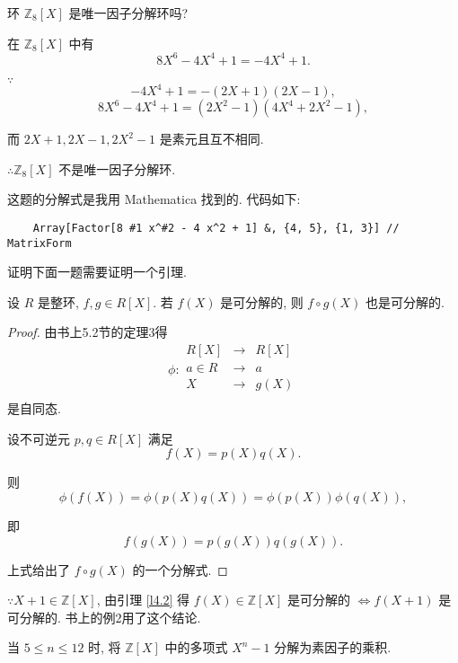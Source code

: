 \documentclass[UTF8]{ctexart}
\begin{document}
\begin{exercise}%
    环 $\mathbb{Z}_8[X]$ 是唯一因子分解环吗?
\end{exercise}
\begin{solution}
    在 $\mathbb{Z}_8[X]$ 中有
    \[8X^6-4X^4+1=-4X^4+1.\]

    $\because$
    \[-4X^4+1=-(2X+1)(2X-1),\]
    \[8X^6-4X^4+1=(2X^2-1)(4X^4+2X^2-1),\]

    而 $2X+1,2X-1,2X^2-1$ 是素元且互不相同.

    $\therefore\mathbb{Z}_8[X]$ 不是唯一因子分解环.
\end{solution}
\begin{note}
    这题的分解式是我用 Mathematica 找到的. 代码如下:
    \begin{verbatim}
    Array[Factor[8 #1 x^#2 - 4 x^2 + 1] &, {4, 5}, {1, 3}] // MatrixForm
    \end{verbatim}
\end{note}
证明下面一题需要证明一个引理.
\begin{lemma}\label{l4.2}
    设 $R$ 是整环, $f,g\in R[X]$. 若 $f(X)$ 是可分解的, 则 $f\circ g(X)$ 也是可分解的.
\end{lemma}
\begin{proof}
    由书上5.2节的定理3得
    \[\phi:\begin{array}{rcl}
        R[X] & \to & R[X] \\
        a\in R & \to & a \\
        X & \to & g(X) \\
    \end{array}\]
    是自同态.

    设不可逆元 $p,q\in R[X]$ 满足
    \[f(X)=p(X)q(X).\]

    则
    \[\phi(f(X))=\phi(p(X)q(X))=\phi(p(X))\phi(q(X)),\]

    即
    \[f(g(X))=p(g(X))q(g(X)).\]

    上式给出了 $f\circ g(X)$ 的一个分解式.
\end{proof}
\begin{note}
    $\because X+1\in\mathbb{Z}[X]$, 由引理 \ref{l4.2} 得 $f(X)\in\mathbb{Z}[X]$ 是可分解的 $\Leftrightarrow f(X+1)$ 是可分解的. 书上的例2用了这个结论.
\end{note}
\begin{exercise}%
    当 $5\leq n\leq 12$ 时, 将 $\mathbb{Z}[X]$ 中的多项式 $X^n-1$ 分解为素因子的乘积.
\end{exercise}
\end{document}
